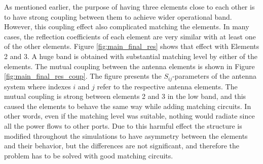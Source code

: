 As mentioned earlier, the purpose of having three elements close to each other is to have strong coupling between them to achieve wider operational band. However, this coupling effect also complicated matching the elements. In many cases, the reflection coefficients of each element are very similar with at least one of the other elements. Figure \ref{fig:main_final_res} shows that effect with Elements 2 and 3. A huge band is obtained with substantial matching level by either of the elements. The mutual coupling between the antenna elements is shown in Figure \ref{fig:main_final_res_coup}. The figure presents the $S_{ij}$-parameters of the antenna system where indexes $i$ and $j$ refer to the respective antenna elements. The mutual coupling is strong between elements 2 and 3 in the low band, and this caused the elements to behave the same way while adding matching circuits. In other words, even if the matching level was suitable, nothing would radiate since all the power flows to other ports. Due to this harmful effect the structure is modified throughout the simulations to have asymmetry between the elements and their behavior, but the differences are not significant, and therefore the problem has to be solved with good matching circuits.

